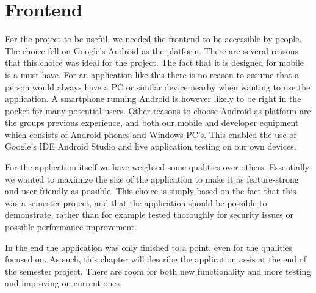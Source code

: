 \chapter{Frontend}
\label{chap:frontend}

For the project to be useful, we needed the frontend to be accessible by people. The choice fell on Google's Android as the platform. There are several reasons that this choice was ideal for the project. The fact that it is designed for mobile is a must have. For an application like this there is no reason to assume that a person would always have a PC or similar device nearby when wanting to use the application. A smartphone running Android is however likely to be right in the pocket for many potential users. Other reasons to choose Android as platform are the groups previous experience, and both our mobile and developer equipment which consists of Android phones and Windows PC's. This enabled the use of Google's IDE Android Studio and live application testing on our own devices.

For the application itself we have weighted some qualities over others. Essentially we wanted to maximize the size of the application to make it as feature-strong and user-friendly as possible. This choice is simply based on the fact that this was a semester project, and that the application should be possible to demonstrate, rather than for example tested thoroughly for security issues or possible performance improvement.

In the end the application was only finished to a point, even for the qualities focused on. As such, this chapter will describe the application as-is at the end of the semester project. There are room for both new functionality and more testing and improving on current ones. 